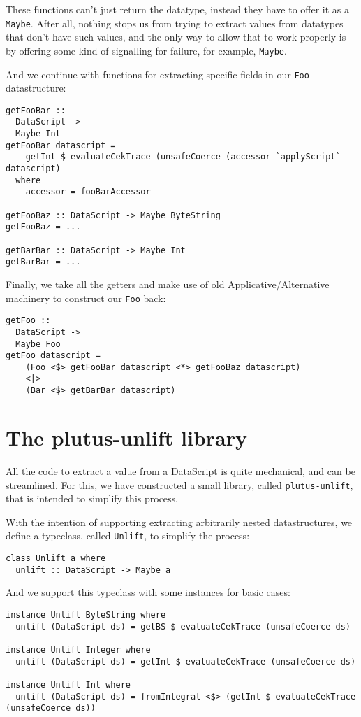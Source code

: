 \documentclass{article}
\begin{document}
These functions can't just return the datatype, instead they have to offer it as a \verb|Maybe|. After all, nothing stops us from trying to extract values from datatypes that don't have such values, and the only way to allow that to work properly is by offering some kind of signalling for failure, for example, \verb|Maybe|.

And we continue with functions for extracting specific fields in our \verb|Foo| datastructure:
\nopagebreak
\begin{verbatim}
getFooBar ::
  DataScript ->
  Maybe Int
getFooBar datascript =
    getInt $ evaluateCekTrace (unsafeCoerce (accessor `applyScript` datascript)
  where
    accessor = fooBarAccessor

getFooBaz :: DataScript -> Maybe ByteString
getFooBaz = ...

getBarBar :: DataScript -> Maybe Int
getBarBar = ...
\end{verbatim}

Finally, we take all the getters and make use of old Applicative/Alternative machinery to construct our \verb|Foo| back:
\nopagebreak

\begin{verbatim}
getFoo ::
  DataScript ->
  Maybe Foo
getFoo datascript =
    (Foo <$> getFooBar datascript <*> getFooBaz datascript)
    <|>
    (Bar <$> getBarBar datascript)
\end{verbatim}

\section{The plutus-unlift library}
All the code to extract a value from a DataScript is quite mechanical, and can be streamlined. For this, we have constructed a small library, called \verb|plutus-unlift|, that is intended to simplify this process.

With the intention of supporting extracting arbitrarily nested datastructures, we define a typeclass, called \verb|Unlift|, to simplify the process:
\nopagebreak

\begin{verbatim}
class Unlift a where
  unlift :: DataScript -> Maybe a
\end{verbatim}

And we support this typeclass with some instances for basic cases:
\nopagebreak

\begin{verbatim}
instance Unlift ByteString where
  unlift (DataScript ds) = getBS $ evaluateCekTrace (unsafeCoerce ds)
  
instance Unlift Integer where
  unlift (DataScript ds) = getInt $ evaluateCekTrace (unsafeCoerce ds)

instance Unlift Int where
  unlift (DataScript ds) = fromIntegral <$> (getInt $ evaluateCekTrace (unsafeCoerce ds))
\end{verbatim}
\end{document}
